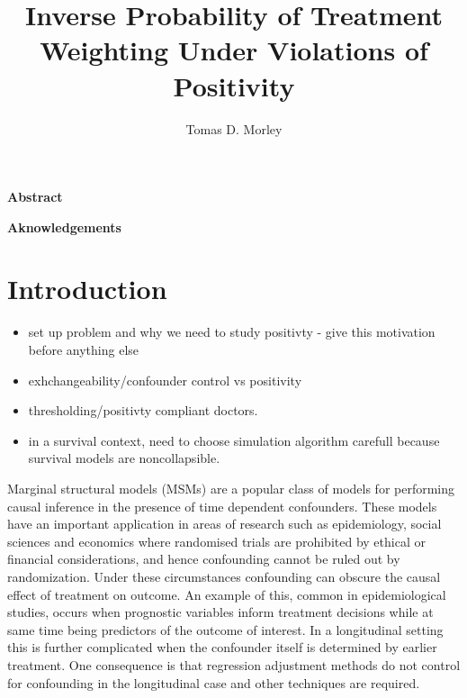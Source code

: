\documentclass[11pt]{article}
\title{Inverse Probability of Treatment Weighting Under Violations of Positivity}
\author{Tomas D. Morley}
\providecommand{\tightlist}{%
      \setlength{\itemsep}{0pt}\setlength{\parskip}{0pt}}
\begin{document}
    
    
    \maketitle
    
    

    
    \newpage

    \textbf{Abstract}

    \newpage

    \textbf{Aknowledgements}

    \newpage

\tableofcontents{}

    \newpage

\section{Introduction}\label{introduction}

\begin{itemize}
\tightlist
\item
  set up problem and why we need to study positivty - give this
  motivation before anything else
\item
  exhchangeability/confounder control vs positivity
\item
  thresholding/positivty compliant doctors.
\item
  in a survival context, need to choose simulation algorithm carefull
  because survival models are noncollapsible.
\end{itemize}

Marginal structural models (MSMs) are a popular class of models for
performing causal inference in the presence of time dependent
confounders. These models have an important application in areas of
research such as epidemiology, social sciences and economics where
randomised trials are prohibited by ethical or financial considerations,
and hence confounding cannot be ruled out by randomization. Under these
circumstances confounding can obscure the causal effect of treatment on
outcome. An example of this, common in epidemiological studies, occurs
when prognostic variables inform treatment decisions while at same time
being predictors of the outcome of interest. In a longitudinal setting
this is further complicated when the confounder itself is determined by
earlier treatment. One consequence is that regression adjustment methods
do not control for confounding in the longitudinal case and other
techniques are required. \linebreak
\end{document}
